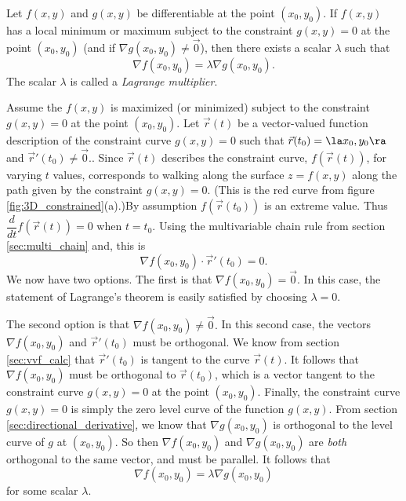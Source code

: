 
{Let $f(x,y)$ and $g(x,y)$ be differentiable at the point $(x_0,y_0)$.  If $f(x,y)$ has a local minimum or maximum subject to the constraint $g(x,y)=0$ at the point $(x_0,y_0)$ (and if $\nabla g(x_0,y_0) \neq \vec{0}$), then there exists a scalar $\lambda$ such that
	\[
		\nabla f(x_0,y_0) = \lambda \nabla g(x_0,y_0).
	\]
The scalar $\lambda$ is called a \emph{Lagrange multiplier}. 
}

{Assume the $f(x,y)$ is maximized (or minimized) subject to the constraint $g(x,y)=0$ at the point $(x_0,y_0)$.  Let $\vec{r}(t)$ be a vector-valued function description of the constraint curve $g(x,y)=0$ such that $\vec{r}(t_0)=\la x_0,y_0 \ra$ and $\vec{r}'(t_0) \neq \vec{0}.$.  Since $\vec{r}(t)$ describes the constraint curve, $f(\vec{r}(t))$, for varying $t$ values, corresponds to walking along the surface $z=f(x,y)$ along the path given by the constraint $g(x,y)=0$. (This is the red curve from figure \ref{fig:3D_constrained}(a).)By assumption $f(\vec{r}(t_0))$ is an extreme value.  Thus $\dfrac{d}{dt} f(\vec{r}(t)) = 0$ when $t = t_0$.  Using the multivariable chain rule from section \ref{sec:multi_chain} and, this is
	\[
		\nabla f(x_0,y_0) \cdot \vec{r}'(t_0)=0.
	\]
We now have two options. The first is that $\nabla f(x_0,y_0) = \vec{0}.$  In this case, the statement of Lagrange's theorem is easily satisfied by choosing $\lambda = 0.$

The second option is that $\nabla f(x_0,y_0) \neq \vec{0}.$ In this second case, the vectors $\nabla f(x_0,y_0)$ and $\vec{r}'(t_0)$ must be orthogonal.  We know from section \ref{sec:vvf_calc} that $\vec{r}'(t_0)$ is tangent to the curve $\vec{r}(t)$.  It follows that $\nabla f(x_0,y_0)$ must be orthogonal to $\vec{r}(t_0)$, which is a vector tangent to the constraint curve $g(x,y)=0$ at the point $(x_0,y_0)$. Finally, the constraint curve $g(x,y)=0$ is simply the zero level curve of the function $g(x,y)$.  From section \ref{sec:directional_derivative}, we know that $\nabla g(x_0,y_0)$ is orthogonal to the level curve of $g$ at $(x_0,y_0)$. So then $\nabla f(x_0,y_0)$ and $\nabla g(x_0,y_0)$ are \emph{both} orthogonal to the same vector, and must be parallel.  It follows that
	\[
		\nabla f(x_0,y_0) = \lambda \nabla g(x_0,y_0)
	\] 
for some scalar $\lambda$.
}

